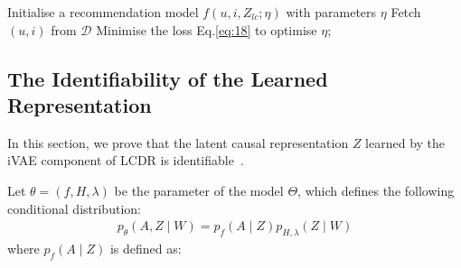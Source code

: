 \documentclass[sigconf]{acmart}
\begin{document}
\begin{algorithm}
    \caption{LCDR Training}
    \label{alg}
    
   
    Initialise a recommendation model $f(u, i,Z_{lc}; \eta)$ with parameters $\eta$\;
    {
    Fetch $(u,i)$ from $\mathcal{D}$\;
    Minimise the loss Eq.\eqref{eq:18} to optimise $\eta$;
    }

    \Output{$\{\eta\}$}
\end{algorithm}


\subsection{The Identifiability of the Learned Representation}
In this section, we prove that the latent causal representation ${Z}$ learned by the iVAE component of LCDR is identifiable~\cite{9,xu2024causal}.

Let $\theta=(f, H, \lambda)$ be the parameter of the model $\Theta$, which defines the following conditional distribution:
\begin{equation}
\begin{split}
\label{zm1}
p_\theta\left({A}, {Z} \mid {W}\right)=p_f\left({A} \mid {Z}\right) p_{H, \lambda}({Z} \mid {W})
\end{split}
\end{equation}
where \( p_f\left({A} \mid {Z}\right) \) is defined as:
\end{document}
